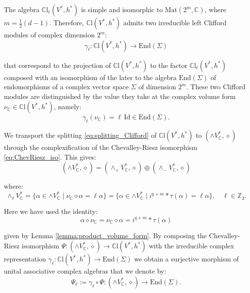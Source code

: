 \documentclass[10pt,a4paper,twoside,reqno]{amsart}
\theoremstyle{plain}
\theoremstyle{definition}
\theoremstyle{remark}
\newcommand{\End}{\mathrm{End}}
\newcommand{\Mat}{\mathrm{Mat}}
\def\C{\mathbb{C}}
\def\Id{\mathrm{Id}}
\begin{document}
\noindent
The algebra $\C\mathrm{l}_\ell(V^*,h^*)$ is simple and isomorphic to $\Mat(2^m,\C)$, where $m=\frac{1}{2}(d-1)$. Therefore, $\C\mathrm{l}(V^*,h^*)$ admits two irreducible left Clifford modules of complex dimension $2^m$: 
\begin{equation*}
\gamma_\ell\colon\C\mathrm{l}(V^*,h^*)\to\End(\Sigma)   
\end{equation*}

\noindent
that correspond to the projection of $\C\mathrm{l}(V^*,h^*)$ to the factor $\C\mathrm{l}_\ell(V^*,h^*)$ composed with an isomorphism of the later to the algebra $\End(\Sigma)$ of endomorphisms of a complex vector space $\Sigma$ of dimension $2^m$. These two Clifford modules are distinguished by the value they take at the complex volume form $\nu_\C\in\C\mathrm{l}(V^*,h^*)$, namely: 
\begin{equation*}
\gamma_\ell(\nu_\C)=\ell\,\Id\in\End(\Sigma) .
\end{equation*}

\noindent
We transport the splitting \eqref{eq:splitting_Clifford} of $\C\mathrm{l}(V^*,h^*)$ to $(\wedge V^*_\C,\diamond)$ through the complexification of the Chevalley-Riesz isomorphism \eqref{eq:ChevRiesz_iso}. This gives: 
\begin{equation*}
(\wedge V^*_\C,\diamond)=(\wedge_+V^*_\C,\diamond)\oplus(\wedge_- V^*_\C,\diamond)    
\end{equation*}

\noindent
where:
\begin{equation*}
\wedge_\ell V^*_\C=\{\alpha\in\wedge V^*_\C\mid\nu_\C\diamond\alpha=\ell\alpha\}=\{\alpha\in\wedge V^*_\C\mid i^{q+m}*\tau(\alpha)=\ell\alpha\},\quad\ell\in\mathbb{Z}_2 .    
\end{equation*}

\noindent
Here we have used the identity: 
\begin{equation}
\label{eq:mult_volume_form_odd}
\alpha\diamond\nu_\C=\nu_\C\diamond\alpha=i^{q+m}*\tau(\alpha)
\end{equation} 

\noindent
given by Lemma \ref{lemma:product_volume_form}. By composing the Chevalley-Riesz isomorphism $\Psi\colon(\wedge V^*_\C,\diamond)\to\C\mathrm{l}(V^*,h^*)$ with the irreducible complex representation $\gamma_\ell\colon\C\mathrm{l}(V^*,h^*)\to\End(\Sigma)$ we obtain a surjective morphism of unital associative complex algebras that we denote by: 
\begin{equation*}
 \Psi_\ell:=\gamma_\ell\circ\Psi\colon(\wedge V^*_\C,\diamond)\to\End(\Sigma) .   
\end{equation*}
\end{document}
